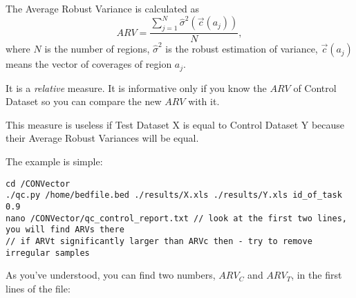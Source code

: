 \documentclass{article}
\begin{document}
The Average Robust Variance is calculated as $$ARV = \frac{\sum_{j = 1}^N {\hat{\sigma}^2(\vec{c}(a_j)) }}{N },$$ where $N$ is the number of regions, $\hat{\sigma}^2$ is the robust estimation of variance, $\vec{c}(a_j)$ means the vector of coverages of region $a_j$.

It is a {\it relative} measure. It is informative only if you know the $ARV$ of Control Dataset so you can compare the new $ARV$ with it.

This measure is useless if Test Dataset X is equal to Control Dataset Y because their Average Robust Variances will be equal.

\begin{usecase}
\end{usecase}

The example is simple:
\begin{lstlisting}[style=DOS, caption={How to get the ARVs}]
cd /CONVector
./qc.py /home/bedfile.bed ./results/X.xls ./results/Y.xls id_of_task 0.9
nano /CONVector/qc_control_report.txt // look at the first two lines, you will find ARVs there
// if ARVt significantly larger than ARVc then - try to remove irregular samples
\end{lstlisting}

As you've understood, you can find two numbers, $ARV_C$ and $ARV_T$, in the first lines of the file:
\end{document}
